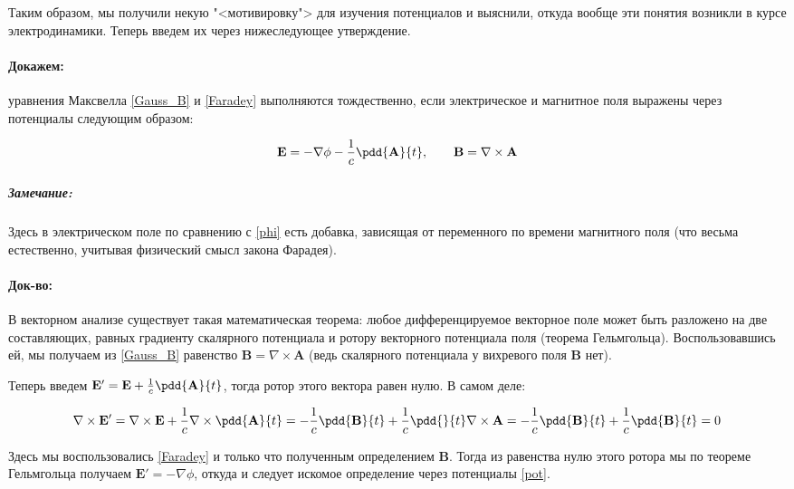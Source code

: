 \documentclass[12pt]{kiarticle}
\begin{document}
Таким образом, мы получили некую "<мотивировку"> для изучения потенциалов и выяснили, откуда вообще эти понятия возникли в курсе электродинамики. Теперь введем их через нижеследующее утверждение.

\paragraph*{Докажем:} уравнения Максвелла \eqref{Gauss_B} и \eqref{Faradey} выполняются тождественно, если электрическое и магнитное поля выражены через потенциалы следующим образом:

\begin{equation}\label{pot}
\mathbf{E} = - \nabla \phi  - \dfrac{1}{c} \pdd{\mathbf{A}}{t}, \qquad \mathbf{B} = \nabla \times \mathbf{A}
\end{equation}

\subparagraph*{Замечание:}Здесь в электрическом поле по сравнению с \eqref{phi} есть добавка, зависящая от переменного по времени магнитного поля (что весьма естественно, учитывая физический смысл закона Фарадея).

\paragraph*{Док-во:} В векторном анализе существует такая математическая теорема: любое дифференцируемое векторное поле может быть разложено на две составляющих, равных градиенту скалярного потенциала и ротору векторного потенциала поля (теорема Гельмгольца). Воспользовавшись ей, мы получаем из \eqref{Gauss_B} равенство $ \mathbf{B} = \nabla \times \mathbf{A} $ (ведь скалярного потенциала у вихревого поля $ \mathbf{B} $ нет). 

Теперь введем $ \mathbf{E}' = \mathbf{E} + \frac{1}{c} \pdd{\mathbf{A}}{t} $, тогда ротор этого вектора равен нулю. В самом деле:

\begin{equation}\label{}
\nabla \times \mathbf{E}' = \nabla \times \mathbf{E} + \dfrac{1}{c}\nabla \times \pdd{\mathbf{A}}{t} = -\dfrac{1}{c} \pdd{\mathbf{B}}{t} +   \dfrac{1}{c}\pdd{}{t} \nabla \times \mathbf{A} = -\dfrac{1}{c} \pdd{\mathbf{B}}{t} + \dfrac{1}{c} \pdd{\mathbf{B}}{t} = 0
\end{equation}

Здесь мы воспользовались \eqref{Faradey} и только что полученным определением $ \mathbf{B} $. Тогда из равенства нулю этого ротора мы по теореме Гельмгольца получаем $ \mathbf{E}' = - \nabla \phi $, откуда и следует искомое определение через потенциалы \eqref{pot}.
\end{document}
